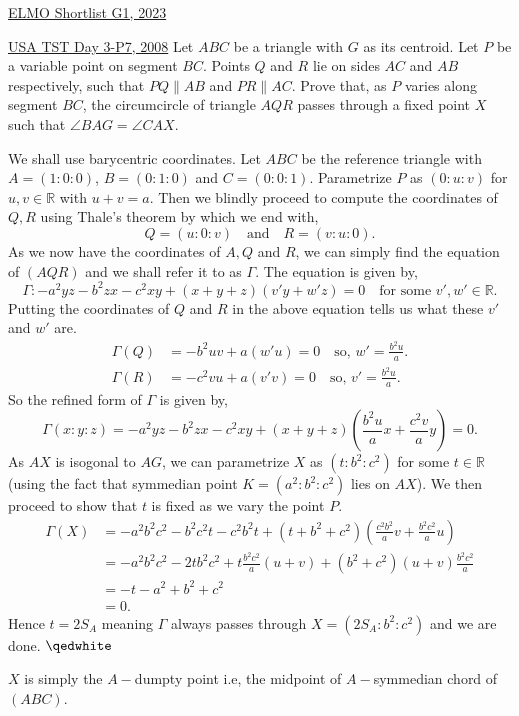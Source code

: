 \begin{problem}{14}{\href{https://artofproblemsolving.com/community/c6h3100572p28033718}{ELMO Shortlist G1, 2023}}
\begin{problem}{10}{\href{https://artofproblemsolving.com/community/q2h224628p35453908}{USA TST Day 3-P7, 2008}} 
	Let $ ABC$ be a triangle with $ G$ as its centroid. Let $ P$ be a variable point on segment $ BC$. Points $ Q$ and $ R$ lie on sides $ AC$ and $ AB$ respectively, such that $ PQ \parallel AB$ and $ PR \parallel AC$. Prove that, as $ P$ varies along segment $ BC$, the circumcircle of triangle $ AQR$ passes through a fixed point $ X$ such that $ \angle BAG = \angle CAX$.
	\begin{solution} We shall use barycentric coordinates. Let $ABC$ be the reference triangle with $A=(1:0:0)$, $B=(0:1:0)$ and $C=(0:0:1)$. Parametrize $P$ as $(0:u:v)$ for $u,v\in\mathbb{R}$ with $u+v=a$. Then we blindly proceed to compute the coordinates of $Q, R$ using Thale's theorem by which we end with,
$$Q=(u:0:v)\quad\text{and}\quad R=(v:u:0).$$As we now have the coordinates of $A,Q$ and $R$, we can simply find the equation of $(AQR)$ and we shall refer it to as $\Gamma$. The equation is given by,
$$\Gamma: -a^2yz -b^2zx-c^2xy+(x+y+z)(v'y+w'z)=0\quad\text{for some $v', w'\in\mathbb{R}$.}$$Putting the coordinates of $Q$ and $R$ in the above equation tells us what these $v'$ and $w'$ are.
\begin{align*} \Gamma(Q)&=-b^2uv+a(w'u)=0 \quad\text{so, $w'=\frac{b^2u}{a}$.}\\ \Gamma(R)&=-c^2vu+a(v'v)=0 \quad\text{so, $v'=\frac{b^2u}{a}$.} \end{align*}So the refined form of $\Gamma$ is given by,
$$\Gamma (x:y:z)=-a^2yz-b^2zx-c^2xy+(x+y+z)\left(\frac{b^2u}{a}x+\frac{c^2v}{a}y\right)=0.$$As $AX$ is isogonal to $AG$, we can parametrize $X$ as $(t:b^2:c^2)$ for some $t\in\mathbb{R}$ (using the fact that symmedian point $K=(a^2:b^2:c^2)$ lies on $AX$). We then proceed to show that $t$ is fixed as we vary the point $P$.
\begin{align*} \Gamma(X)&= -a^2b^2c^2-b^2c^2t-c^2b^2t+(t+b^2+c^2)\left(\frac{c^2b^2}{a}v+\frac{b^2c^2}{a}u\right)\\ &=-a^2b^2c^2-2tb^2c^2+t\frac{b^2c^2}{a}(u+v)+(b^2+c^2)(u+v)\frac{b^2c^2}{a}\\ &=-t-a^2+b^2+c^2\\ &=0. \end{align*}Hence $t=2S_A$ meaning $\Gamma$ always passes through $X=(2S_A:b^2:c^2)$ and we are done. $\qedwhite$

	\begin{remark} 
		$X$ is simply the $A-$dumpty point i.e, the midpoint of $A-$symmedian chord of $(ABC)$.
	\end{remark}
	\end{solution}
\end{problem}
	

\end{problem}

